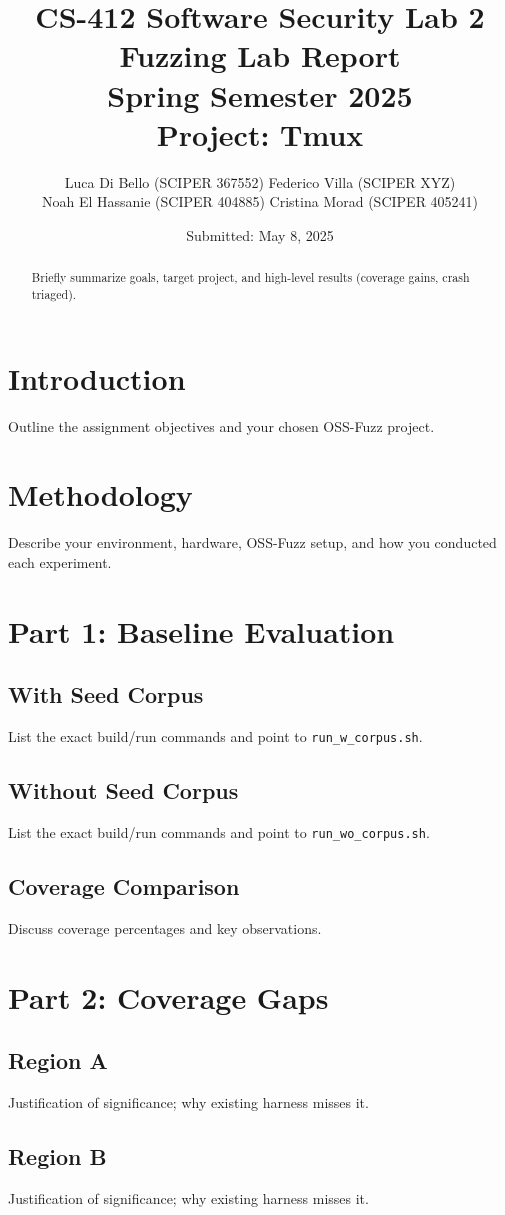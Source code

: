 \documentclass[11pt,a4paper,twocolumn]{article}
\title{%
  CS-412 Software Security Lab 2\\[0.5em]
  \Large Fuzzing Lab Report\\
  Spring Semester 2025\\[0.5em]
  Project: Tmux
}
\author{%
  Luca Di Bello (SCIPER 367552)
  Federico Villa (SCIPER XYZ) \\
  Noah El Hassanie (SCIPER 404885)
  Cristina Morad (SCIPER 405241) \\
}
\date{Submitted: May 8, 2025}
\begin{document}
\maketitle

\begin{abstract}
	Briefly summarize goals, target project, and high-level results (coverage gains, crash triaged).
\end{abstract}

\section{Introduction}
Outline the assignment objectives and your chosen OSS-Fuzz project.

\section{Methodology}
Describe your environment, hardware, OSS-Fuzz setup, and how you conducted each experiment.

\section{Part 1: Baseline Evaluation}
\subsection{With Seed Corpus}
List the exact build/run commands and point to \texttt{run\_w\_corpus.sh}.
\subsection{Without Seed Corpus}
List the exact build/run commands and point to \texttt{run\_wo\_corpus.sh}.
\subsection{Coverage Comparison}
Discuss coverage percentages and key observations.

\section{Part 2: Coverage Gaps}
\subsection{Region A}
Justification of significance; why existing harness misses it.
\subsection{Region B}
Justification of significance; why existing harness misses it.
\end{document}
